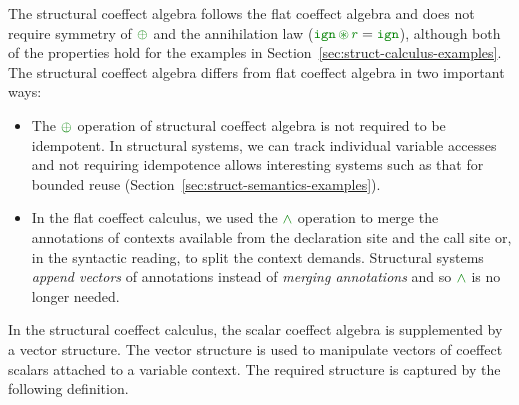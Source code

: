 \noindent
The structural coeffect algebra follows the flat coeffect algebra and does not require symmetry of 
$\cpar$ and the annihilation law ($\czero\,\cseq\,\cclrd{r} = \czero$), although both of the properties
hold for the examples in Section~\ref{sec:struct-calculus-examples}. The structural coeffect algebra 
differs from flat coeffect algebra in two important ways:
%
\begin{itemize}
\item The $\cpar$ operation of structural coeffect algebra is not required to be idempotent. In structural
  systems, we can track individual variable accesses and not requiring idempotence allows interesting
  systems such as that for bounded reuse (Section~\ref{sec:struct-semantics-examples}).

\item In the flat coeffect calculus, we used the $\czip$ operation to merge the annotations of contexts
  available from the declaration site and the call site or, in the syntactic reading, to split the
  context demands. Structural systems \emph{append vectors} of annotations instead of
  \emph{merging annotations} and so $\czip$ is no longer needed.
\end{itemize}

\noindent
In the structural coeffect calculus, the scalar coeffect algebra is supplemented by a vector
structure. The vector structure is used to manipulate vectors of coeffect scalars attached to a
variable context. The required structure is captured by the following definition.

